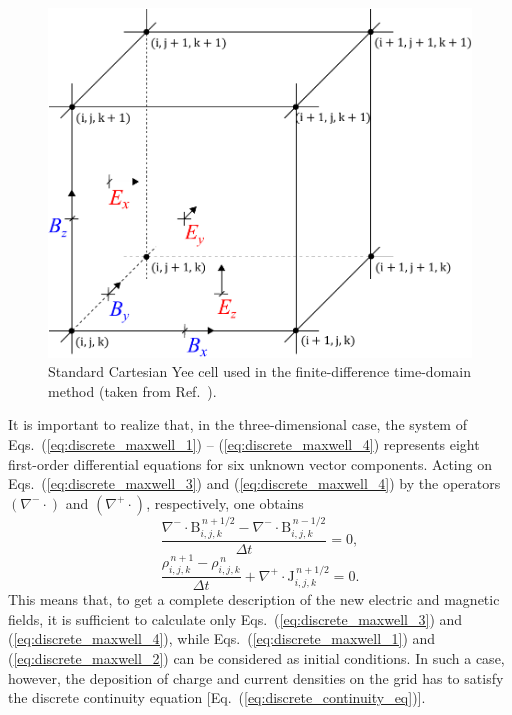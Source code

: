 \documentclass[10pt, a4paper, twoside, openright]{report}
\renewcommand{\vec}[1]{\boldsymbol{\mathrm{#1}}}
\begin{document}
\begin{figure}[t]
	\includegraphics[width=0.35\paperwidth]{./img/yee.pdf}
	\caption[]{\label{fig:yee_lattice} Standard Cartesian Yee cell used in the finite-difference time-domain method (taken from Ref.~).}
\end{figure}

It is important to realize that, in the three-dimensional case, the system of Eqs.~(\ref{eq:discrete_maxwell_1}) -- (\ref{eq:discrete_maxwell_4}) represents eight first-order differential equations for six unknown vector components. Acting on Eqs.~(\ref{eq:discrete_maxwell_3}) and (\ref{eq:discrete_maxwell_4}) by the operators $ \left(\nabla^{-}\cdot\right) $ and $ \left(\nabla^{+}\cdot\right) $, respectively, one obtains
\begin{equation}\label{eq:discrete_eq_for_B}
	\frac{\nabla^{-} \cdot \vec{B}_{i, j, k}^{\,n + 1/2} - \nabla^{-} \cdot \vec{B}_{i, j, k}^{\,n - 1/2}}{\Delta t} = 0,
\end{equation}
\begin{equation}\label{eq:discrete_continuity_eq}
	\frac{\rho_{i, j, k}^{\,n + 1} - \rho_{i, j, k}^{\,n}}{\Delta t} + \nabla^{+} \cdot \vec{J}_{i, j, k}^{\,n + 1/2} = 0.
\end{equation}
This means that, to get a complete description of the new electric and magnetic fields, it is sufficient to calculate only Eqs.~(\ref{eq:discrete_maxwell_3}) and (\ref{eq:discrete_maxwell_4}), while Eqs.~(\ref{eq:discrete_maxwell_1}) and (\ref{eq:discrete_maxwell_2}) can be considered as initial conditions. In such a case, however, the deposition of charge and current densities on the grid has to satisfy the discrete continuity equation [Eq.~(\ref{eq:discrete_continuity_eq})].
\end{document}
